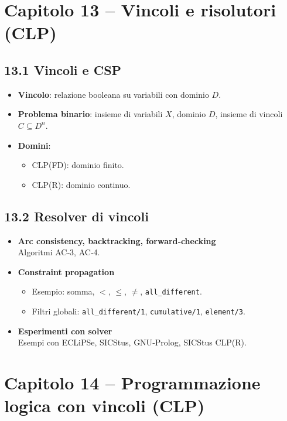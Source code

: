 \documentclass[12pt]{article}
\begin{document}
\section*{Capitolo 13 – Vincoli e risolutori (CLP)}

\subsection*{13.1 Vincoli e CSP}

\begin{itemize}
  \item \textbf{Vincolo}: relazione booleana su variabili con dominio $D$.
  \item \textbf{Problema binario}: insieme di variabili $X$, dominio $D$, insieme di vincoli $C \subseteq D^n$.
  \item \textbf{Domini}: 
    \begin{itemize}
      \item CLP(FD): dominio finito.
      \item CLP(R): dominio continuo.
    \end{itemize}
\end{itemize}

\subsection*{13.2 Resolver di vincoli}

\begin{itemize}
  \item \textbf{Arc consistency, backtracking, forward‐checking}\\
    Algoritmi AC‐3, AC‐4.
  \item \textbf{Constraint propagation}\\
    \begin{itemize}
      \item Esempio: somma, $<$, $\leq$, $\neq$, \texttt{all\_different}.
      \item Filtri globali: \texttt{all\_different/1}, \texttt{cumulative/1}, \texttt{element/3}.
    \end{itemize}
  \item \textbf{Esperimenti con solver}\\
    Esempi con ECLiPSe, SICStus, GNU‐Prolog, SICStus CLP(R).
\end{itemize}

\section*{Capitolo 14 – Programmazione logica con vincoli (CLP)}
\end{document}
